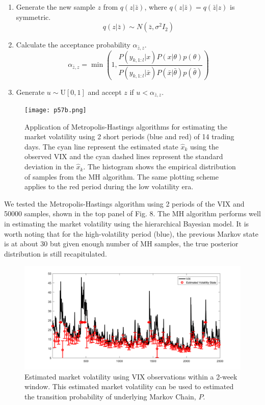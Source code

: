 \documentclass[a4paper, 11pt]{article}
\begin{document}
\begin{enumerate}
\item Generate the new sample $z$ from $q(z|\bar{z})$, where $q(z|\bar{z}) = q(\bar{z}|z)$ is symmetric.
\begin{equation}
q(z|\bar{z}) \sim N(\bar{z}, \sigma^2I_2)
\end{equation}

\item Calculate the acceptance probability $\alpha_{\bar{z}, z}$.
\begin{equation}
\alpha_{\bar{z}, z} = \min\left(1, \frac{P(y_{k,1:l}|x)P(x|\theta)p(\theta)}{P(y_{k,1:l}|\bar{x})P(\bar{x}|\bar{\theta})p(\bar{\theta})} \right)
\end{equation}

\item Generate $u\sim \text{U}[0,1]$ and accept $z$ if $u < \alpha_{\bar{z}, z}$.
\end{enumerate} 

\begin{figure}
	\begin{center}
		\texttt{[image: p57b.png]}
		\caption{Application of Metropolis-Hastings algorithms for estimating the market volatility using 2 short periods (blue and red) of 14 trading days. The cyan line represent the estimated state $\hat{x}_k$ using the observed VIX and the cyan dashed lines represent the standard deviation in the $\hat{x}_k$. The histogram shows the empirical distribution of samples from the MH algorithm. The same plotting scheme applies to the red period during the low volatility era. } 
	\end{center}
\end{figure}

We tested the Metropolis-Hastings algorithm using 2 periods of the VIX and 50000 samples, shown in the top panel of Fig. 8. The MH algorithm performs well in estimating the market volatility using the hierarchical Bayesian model. It is worth noting that for the high-volatility period (blue), the previous Markov state is at about 30 but given enough number of MH samples, the true posterior distribution is still recapitulated. 


\begin{figure}
	\begin{center}
		\includegraphics[width=6.5in]{p57c.png}
		\caption{Estimated market volatility using VIX observations within a 2-week window. This estimated market volatility can be used to estimated the transition probability of underlying Markov Chain, $P$.} 
	\end{center}
\end{figure}
\end{document}
